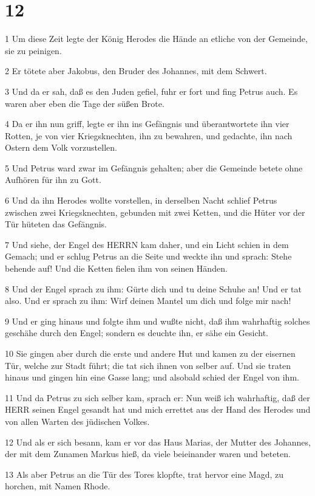 \chapter{12}

\par 1 Um diese Zeit legte der König Herodes die Hände an etliche von der Gemeinde, sie zu peinigen.
\par 2 Er tötete aber Jakobus, den Bruder des Johannes, mit dem Schwert.
\par 3 Und da er sah, daß es den Juden gefiel, fuhr er fort und fing Petrus auch. Es waren aber eben die Tage der süßen Brote.
\par 4 Da er ihn nun griff, legte er ihn ins Gefängnis und überantwortete ihn vier Rotten, je von vier Kriegsknechten, ihn zu bewahren, und gedachte, ihn nach Ostern dem Volk vorzustellen.
\par 5 Und Petrus ward zwar im Gefängnis gehalten; aber die Gemeinde betete ohne Aufhören für ihn zu Gott.
\par 6 Und da ihn Herodes wollte vorstellen, in derselben Nacht schlief Petrus zwischen zwei Kriegsknechten, gebunden mit zwei Ketten, und die Hüter vor der Tür hüteten das Gefängnis.
\par 7 Und siehe, der Engel des HERRN kam daher, und ein Licht schien in dem Gemach; und er schlug Petrus an die Seite und weckte ihn und sprach: Stehe behende auf! Und die Ketten fielen ihm von seinen Händen.
\par 8 Und der Engel sprach zu ihm: Gürte dich und tu deine Schuhe an! Und er tat also. Und er sprach zu ihm: Wirf deinen Mantel um dich und folge mir nach!
\par 9 Und er ging hinaus und folgte ihm und wußte nicht, daß ihm wahrhaftig solches geschähe durch den Engel; sondern es deuchte ihn, er sähe ein Gesicht.
\par 10 Sie gingen aber durch die erste und andere Hut und kamen zu der eisernen Tür, welche zur Stadt führt; die tat sich ihnen von selber auf. Und sie traten hinaus und gingen hin eine Gasse lang; und alsobald schied der Engel von ihm.
\par 11 Und da Petrus zu sich selber kam, sprach er: Nun weiß ich wahrhaftig, daß der HERR seinen Engel gesandt hat und mich errettet aus der Hand des Herodes und von allen Warten des jüdischen Volkes.
\par 12 Und als er sich besann, kam er vor das Haus Marias, der Mutter des Johannes, der mit dem Zunamen Markus hieß, da viele beieinander waren und beteten.
\par 13 Als aber Petrus an die Tür des Tores klopfte, trat hervor eine Magd, zu horchen, mit Namen Rhode.
